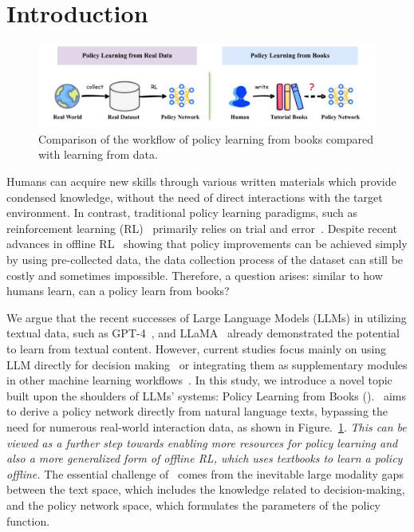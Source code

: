 
\section{Introduction}

\begin{figure}[h]
    \centering
    \vspace{-4mm}
    \includegraphics[width=1.0\linewidth]{fig/PER-problem.pdf}
    \caption{Comparison of the workflow of policy learning from books compared with learning from data.}
    \label{fig:problem}
    \vspace{-2mm}
\end{figure}

Humans can acquire new skills through various written materials which provide condensed knowledge, without the need of direct interactions with the target environment. 
In contrast, traditional policy learning paradigms, such as reinforcement learning (RL)~\citep{rl@2018sutton} primarily relies on trial and error~\citep{dqn2016van, ppo2017schulman, fusion2022jonas}. 
Despite recent advances in offline RL~\citep{cql@2020aviral,mopo@2020tianhe} showing that policy improvements can be achieved simply by using pre-collected data, the data collection process of the dataset can still be costly and sometimes impossible. Therefore, a question arises: similar to how humans learn, can a policy learn from books?



We argue that the recent successes of Large Language Models (LLMs) in utilizing textual data, such as GPT-4~\citep{gpt42023achiam}, and LLaMA~\citep{llama2023hugo} already demonstrated the potential to learn from textual content. However, current studies focus mainly on using LLM directly for decision making~\citep{voyager2023guanzhi, szot2023large} or integrating them as supplementary modules in other machine learning workflows~\cite{xi2023rise, hu2024survey, guo2024large}.
In this study, we introduce a novel topic built upon the shoulders of LLMs' systems: Policy Learning from Books (\topic). \topic~aims to derive a policy network directly from natural language texts, bypassing the need for numerous real-world interaction data, as shown in Figure.~\ref{fig:problem}. \textit{This can be viewed as a further step towards enabling more resources for policy learning and also a more generalized form of offline RL, which uses textbooks to learn a policy offline.} 
The essential challenge of \topic~comes from the inevitable large modality gaps between the text space, which includes the knowledge related to decision-making, and the policy network space, which formulates the parameters of the policy function. 


